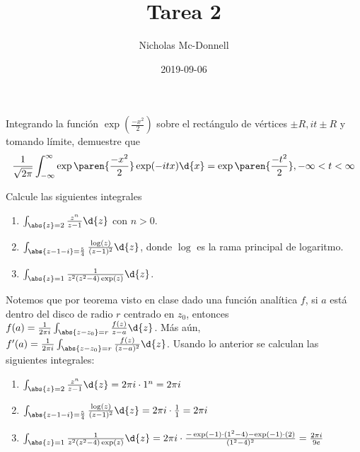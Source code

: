 \documentclass{homework}
\title{Tarea 2}
\date{2019-09-06}
\author{Nicholas Mc-Donnell}
\begin{document}
\maketitle
{}
\newpage
\tableofcontents
\newpage
{}

\begin{prob}
    Integrando la función \(\exp(\frac{-x^2}2)\) sobre el rectángulo de vértices \(\pm R,it\pm R\) y tomando límite, demuestre que
    \begin{equation*}
        \frac1{\sqrt{2\pi}}\int_{-\infty}^\infty\exp\paren{\frac{-x^2}2}\exp(-itx)\d{x}=\exp\paren{\frac{-t^2}2},-\infty<t<\infty
    \end{equation*}
\end{prob}

\begin{sol}
    
\end{sol}

\begin{prob}
    Calcule las siguientes integrales
    \begin{enumerate}
        \item \(\int_{\abs{z}=2}\frac{z^n}{z-1}\d{z}\) con \(n>0\).
        \item \(\int_{\abs{z-1-i}=\frac54}\frac{\log(z)}{(z-1)^2}\d{z}\), donde \(\log\) es la rama principal de logaritmo.
        \item \(\int_{\abs{z}=1}\frac1{z^2(z^2-4)\exp(z)}\d{z}\).
    \end{enumerate}
\end{prob}

\begin{sol}
    Notemos que por teorema visto en clase dado una función analítica \(f\), si \(a\) está dentro del disco de radio \(r\) centrado en \(z_0\), entonces \(f(a)=\frac1{2\pi i}\int_{\abs{z-z_0}=r}\frac{f(z)}{z-a}\d{z}\). Más aún, \(f'(a)=\frac1{2\pi i}\int_{\abs{z-z_0}=r}\frac{f(z)}{(z-a)^2}\d{z}\). Usando lo anterior se calculan las siguientes integrales:
    \begin{enumerate}
        \item \(\int_{\abs{z}=2}\frac{z^n}{z-1}\d{z}=2\pi i\cdot 1^n=2\pi i\)
        \item \(\int_{\abs{z-1-i}=\frac54}\frac{\log(z)}{(z-1)^2}\d{z}=2\pi i\cdot\frac11=2\pi i\)
        \item \(\int_{\abs{z}=1}\frac1{z^2(z^2-4)\exp(z)}\d{z}=2\pi i\cdot\frac{-\exp(-1)\cdot(1^2-4)-\exp(-1)\cdot(2)}{(1^2-4)^2}=\frac{2\pi i}{9e}\)
    \end{enumerate}
\end{sol}
\end{document}
